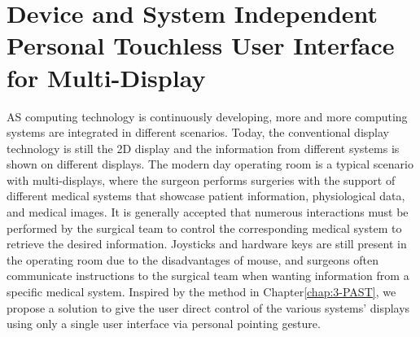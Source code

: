 %

\chapter{Device and System Independent Personal Touchless User Interface for Multi-Display}
AS computing technology is continuously developing, more and more computing systems are integrated in different scenarios. Today, the conventional display technology is still the 2D display and the information from different systems is shown on different displays. The modern day operating room is a typical scenario with multi-displays, where the surgeon performs surgeries with the support of different medical systems that showcase patient information, physiological data, and medical images. It is generally accepted that numerous interactions must be performed by the surgical team to control the corresponding medical system to retrieve the desired information. Joysticks and hardware keys are still present in the operating room due to the disadvantages of mouse, and surgeons often communicate instructions to the surgical team when wanting information from a specific medical system. Inspired by the method in Chapter\ref{chap:3-PAST}, we propose a solution to give the user direct control of the various systems' displays using only a single user interface via personal pointing gesture. 

